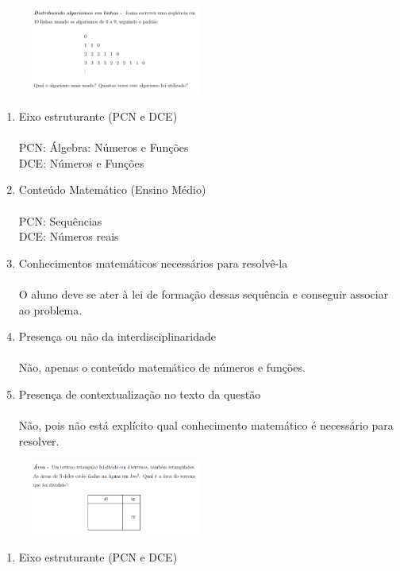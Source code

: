 \documentclass[a4paper, 12pt]{article}
\begin{document}
\begin{enumerate}
\begin{figure}[h!]
  \centering
  \includegraphics[width=0.5\textwidth]{2}
\end{figure} 
  \begin{enumerate}
  \item Eixo estruturante (PCN e DCE)\\\\
    PCN: Álgebra: Números e Funções\\
    DCE: Números e Funções
  \item Conteúdo Matemático (Ensino Médio) \\\\
    PCN: Sequências\\
    DCE: Números reais
  \item Conhecimentos matemáticos necessários para resolvê-la \\\\
    O aluno deve se ater à lei de formação dessas sequência e conseguir associar ao problema.
  \item Presença ou não da interdisciplinaridade \\\\
    Não, apenas o conteúdo matemático de números e funções.
  \item Presença de contextualização no texto da questão\\\\
    Não, pois não está explícito qual conhecimento matemático é necessário para resolver.
  \end{enumerate}
\begin{figure}[h!]
  \centering
  \includegraphics[width=0.5\textwidth]{3}
\end{figure} 
  \begin{enumerate}
  \item Eixo estruturante (PCN e DCE)\\\\

\end{enumerate}
\end{enumerate}
\end{document}

